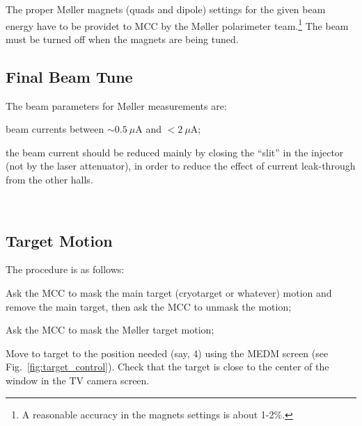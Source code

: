 {The proper M{\o}ller magnets (quads and dipole) settings for the given beam energy 
have to be providet to MCC by the M{\o}ller polarimeter team.\footnote{A reasonable accuracy in the  magnets settings is about 1-2\%.}
   The beam must be turned off when the magnets are being tuned. 

\subsection {Final Beam Tune}
\label{sec:moller_oper_finalbeam}
\vspace{-\parskip}
 The beam parameters for M{\o}ller measurements
 are: 
 \vspace{-\parskip}
  \begin{list}{--}{\setlength{\itemsep}{-0.15cm}}        
     \item 
     beam currents between $\sim{}0.5~\mu$A and $<2~\mu$A;
     \item the beam current should be reduced mainly by closing the ``slit''
           in the injector (not by the laser attenuator), in order to
           reduce the effect of current leak-through from the other halls.
   \end{list}
\
\subsection {Target Motion}
\label{sec:moller_oper_target}
\vspace{-\parskip}
 The procedure is as follows:
\vspace{-\parskip}
   \begin{list}{--}{\setlength{\itemsep}{-0.15cm}}        
     \item Ask the MCC to mask the main target (cryotarget or whatever) motion
           and remove the main target, then ask the MCC to unmask the motion;
     \item Ask the MCC to mask the M{\o}ller target motion;
     \item Move to target to the position needed (say, 4) using
           the MEDM screen {(see Fig.~\ref{fig:target_control})}.
           Check that the target is close to the center of the window
           in the TV camera screen. 
   \end{list}

}
